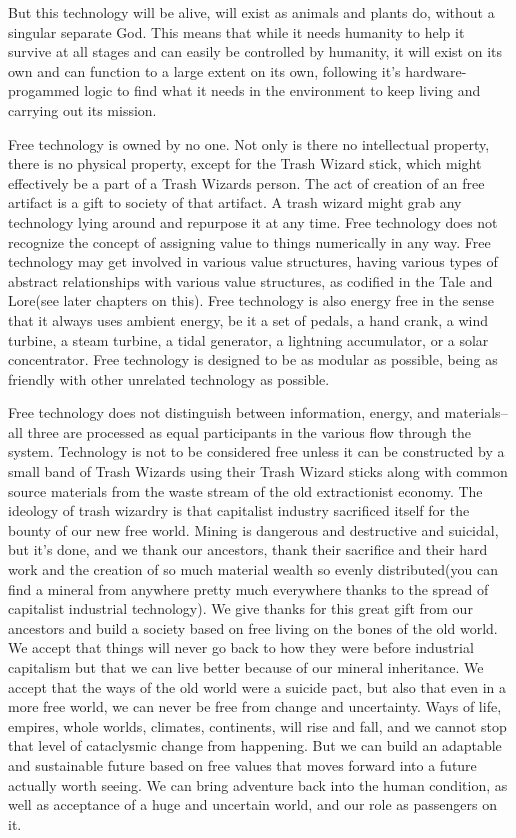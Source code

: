 But this technology will be alive, will exist as animals and plants do,
without a singular separate God. This means that while it needs humanity
to help it survive at all stages and can easily be controlled by
humanity, it will exist on its own and can function to a large extent on
its own, following it's hardware-progammed logic to find what it needs
in the environment to keep living and carrying out its mission.

Free technology is owned by no one. Not only is there no intellectual
property, there is no physical property, except for the Trash Wizard
stick, which might effectively be a part of a Trash Wizards person. The
act of creation of an free artifact is a gift to society of that
artifact. A trash wizard might grab any technology lying around and
repurpose it at any time. Free technology does not recognize the concept
of assigning value to things numerically in any way. Free technology may
get involved in various value structures, having various types of
abstract relationships with various value structures, as codified in the
Tale and Lore(see later chapters on this). Free technology is also
energy free in the sense that it always uses ambient energy, be it a set
of pedals, a hand crank, a wind turbine, a steam turbine, a tidal
generator, a lightning accumulator, or a solar concentrator. Free
technology is designed to be as modular as possible, being as friendly
with other unrelated technology as possible.

Free technology does not distinguish between information, energy, and
materials--all three are processed as equal participants in the various
flow through the system. Technology is not to be considered free unless
it can be constructed by a small band of Trash Wizards using their Trash
Wizard sticks along with common source materials from the waste stream
of the old extractionist economy. The ideology of trash wizardry is that
capitalist industry sacrificed itself for the bounty of our new free
world. Mining is dangerous and destructive and suicidal, but it's done,
and we thank our ancestors, thank their sacrifice and their hard work
and the creation of so much material wealth so evenly distributed(you
can find a mineral from anywhere pretty much everywhere thanks to the
spread of capitalist industrial technology). We give thanks for this
great gift from our ancestors and build a society based on free living
on the bones of the old world. We accept that things will never go back
to how they were before industrial capitalism but that we can live
better because of our mineral inheritance. We accept that the ways of
the old world were a suicide pact, but also that even in a more free
world, we can never be free from change and uncertainty. Ways of life,
empires, whole worlds, climates, continents, will rise and fall, and we
cannot stop that level of cataclysmic change from happening. But we can
build an adaptable and sustainable future based on free values that
moves forward into a future actually worth seeing. We can bring
adventure back into the human condition, as well as acceptance of a huge
and uncertain world, and our role as passengers on it.


